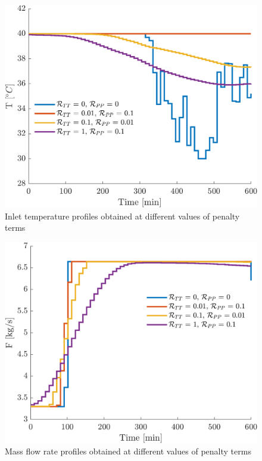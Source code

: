 \documentclass[a4paper,fleqn]{cas-dc}
\begin{document}
\begin{figure}[!ht]
	\centering
	\includegraphics[trim = 0.0cm 0.0cm 0.0cm 0.0cm,clip,width=0.9\columnwidth]{Figures/Results/T_Penalty_Analysis.png}
	\caption{Inlet temperature profiles obtained at different values of penalty terms}
	\label{fig:Penalty_Analysis_T}
\end{figure}

\begin{figure}[!ht]
	\centering
	\includegraphics[trim = 0.0cm 0.0cm 0.0cm 0.0cm,clip,width=0.9\columnwidth]{Figures/Results/F_Penalty_Analysis.png}
	\caption{Mass flow rate profiles obtained at different values of penalty terms}
	\label{fig:Penalty_Analysis_F}
\end{figure}
\end{document}

